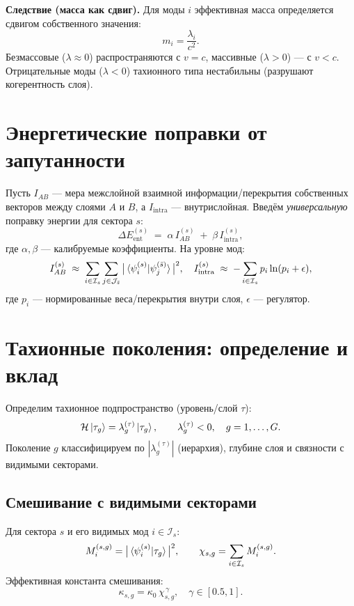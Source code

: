 \documentclass[12pt,a4paper]{article}
\begin{document}
\textbf{Следствие (масса как сдвиг).} Для моды $i$ эффективная масса определяется сдвигом собственного значения:
\[
m_i=\frac{\lambda_i}{c^2}.
\]
Безмассовые ($\lambda\approx 0$) распространяются с $v=c$, массивные ($\lambda>0$) --- с $v<c$. Отрицательные моды ($\lambda<0$) тахионного типа нестабильны (разрушают когерентность слоя).

\section{Энергетические поправки от запутанности}
Пусть $I_{AB}$ --- мера межслойной взаимной информации/перекрытия собственных векторов между слоями $A$ и $B$, а $I_{\text{intra}}$ --- внутрислойная. Введём \emph{универсальную} поправку энергии для сектора $s$:
\begin{equation}
\Delta E^{(s)}_{\text{ent}} \;=\; \alpha\, I_{AB}^{(s)} \;+\; \beta\, I_{\text{intra}}^{(s)} ,
\label{eq:ent_energy}
\end{equation}
где $\alpha,\beta$ --- калибруемые коэффициенты. На уровне мод:
\[
I_{AB}^{(s)} \;\approx\; \sum_{i\in \mathcal{I}_s}\sum_{j\in \mathcal{J}_{\bar{s}}}
\big|\braket{\psi^{(s)}_i|\psi^{(\bar{s})}_j}\big|^2,
\quad
I_{\text{intra}}^{(s)} \;\approx\; -\sum_{i\in \mathcal{I}_s} p_i\ln(p_i+\epsilon),
\]
где $p_i$ --- нормированные веса/перекрытия внутри слоя, $\epsilon$ --- регулятор.

\section{Тахионные поколения: определение и вклад}
Определим тахионное подпространство (уровень/слой $\tau$):
\[
\mathcal{H}\ket{\tau_g}=\lambda^{(\tau)}_g \ket{\tau_g}, \qquad \lambda^{(\tau)}_g<0,\quad g=1,\dots,G.
\]
Поколение $g$ классифицируем по $|\lambda^{(\tau)}_g|$ (иерархия), глубине слоя и связности с видимыми секторами.

\subsection*{Смешивание с видимыми секторами}
Для сектора $s$ и его видимых мод $i\in \mathcal{I}_s$:
\[
M^{(s,g)}_i=\big|\braket{\psi^{(s)}_i|\tau_g}\big|^2,\qquad
\chi_{s,g}=\sum_{i\in \mathcal{I}_s} M^{(s,g)}_i .
\]
Эффективная константа смешивания:
\[
\kappa_{s,g}=\kappa_0\,\chi_{s,g}^{\,\gamma},\quad \gamma\in[0.5,1].
\]
\end{document}
